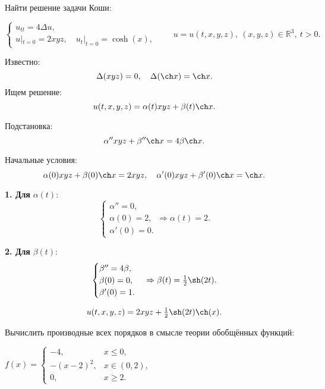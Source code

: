 \begin{cond}
	Найти решение задачи Коши:

	\(
	\begin{cases}
		u_{tt} = 4\Delta u, \\
		u|_{t=0} = 2xyz,\quad u_t|_{t=0} = \cosh (x),
	\end{cases}
	\qquad
	u = u(t,x,y,z),\ (x,y,z)\in\mathbb{R}^3,\ t>0.
	\)
\end{cond}

\begin{sol}
	Известно:
	\[
		\Delta(xyz)=0,\quad \Delta(\ch x)=\ch x.
	\]
	Ищем решение:
	\[
		u(t,x,y,z)=\alpha(t)xyz+\beta(t)\ch x.
	\]

	Подстановка:
	\[
		\alpha''xyz+\beta''\ch x=4\beta\ch x.
	\]

	Начальные условия:
	\[
		\alpha(0)xyz+\beta(0)\ch x=2xyz,\quad
		\alpha'(0)xyz+\beta'(0)\ch x=\ch x.
	\]

	\textbf{1. Для }$\alpha(t)$:
	\[
		\begin{cases}
			\alpha''=0,  \\
			\alpha(0)=2, \\
			\alpha'(0)=0.
		\end{cases}
		\Rightarrow \alpha(t)=2.
	\]

	\textbf{2. Для }$\beta(t)$:
	\[
		\begin{cases}
			\beta''=4\beta, \\
			\beta(0)=0,     \\
			\beta'(0)=1.
		\end{cases}
		\Rightarrow \beta(t)=\tfrac{1}{2}\sh(2t).
	\]
\end{sol}

\begin{out}
	\[
		u(t,x,y,z)=2xyz+\tfrac{1}{2}\sh(2t)\ch(x).
	\]
\end{out}


\begin{cond}
	Вычислить производные всех порядков в смысле теории обобщённых функций:

	\(
	f(x) =
	\begin{cases}
		-4,       & x \le 0,     \\
		-(x-2)^2, & x \in (0,2), \\
		0,        & x \ge 2.
	\end{cases}
	\)
\end{cond}

